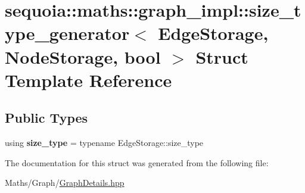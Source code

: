 \hypertarget{structsequoia_1_1maths_1_1graph__impl_1_1size__type__generator}{}\section{sequoia\+::maths\+::graph\+\_\+impl\+::size\+\_\+type\+\_\+generator$<$ Edge\+Storage, Node\+Storage, bool $>$ Struct Template Reference}
\label{structsequoia_1_1maths_1_1graph__impl_1_1size__type__generator}
\subsection*{Public Types}
\begin{DoxyCompactItemize}
\item 
\mbox{\label{structsequoia_1_1maths_1_1graph__impl_1_1size__type__generator_a03eedeeaeb7be5c50c1627f0112a0601}} 
using {\bfseries size\+\_\+type} = typename Edge\+Storage\+::size\+\_\+type
\end{DoxyCompactItemize}


The documentation for this struct was generated from the following file\+:\begin{DoxyCompactItemize}
\item 
Maths/\+Graph/\mbox{\hyperlink{_graph_details_8hpp}{Graph\+Details.\+hpp}}\end{DoxyCompactItemize}
